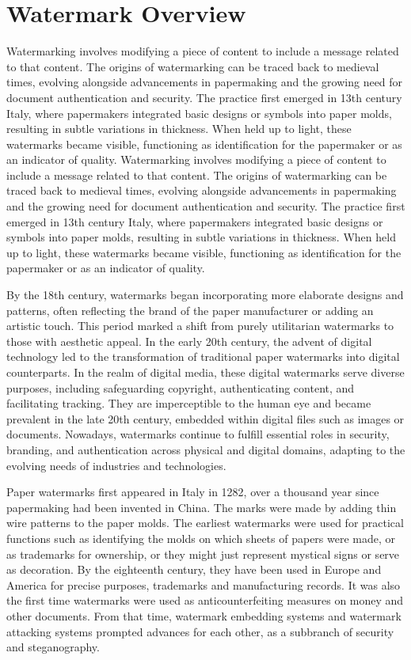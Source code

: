 \section{Watermark Overview}
Watermarking involves modifying a piece of content to include a message related to that content. The origins of watermarking can be traced back to medieval times, evolving alongside advancements in papermaking and the growing need for document authentication and security. The practice first emerged in 13th century Italy, where papermakers integrated basic designs or symbols into paper molds, resulting in subtle variations in thickness. When held up to light, these watermarks became visible, functioning as identification for the papermaker or as an indicator of quality. Watermarking involves modifying a piece of content to include a message related to that content. The origins of watermarking can be traced back to medieval times, evolving alongside advancements in papermaking and the growing need for document authentication and security. The practice first emerged in 13th century Italy, where papermakers integrated basic designs or symbols into paper molds, resulting in subtle variations in thickness. When held up to light, these watermarks became visible, functioning as identification for the papermaker or as an indicator of quality.

By the 18th century, watermarks began incorporating more elaborate designs and patterns, often reflecting the brand of the paper manufacturer or adding an artistic touch. This period marked a shift from purely utilitarian watermarks to those with aesthetic appeal. In the early 20th century, the advent of digital technology led to the transformation of traditional paper watermarks into digital counterparts. In the realm of digital media, these digital watermarks serve diverse purposes, including safeguarding copyright, authenticating content, and facilitating tracking. They are imperceptible to the human eye and became prevalent in the late 20th century, embedded within digital files such as images or documents. Nowadays, watermarks continue to fulfill essential roles in security, branding, and authentication across physical and digital domains, adapting to the evolving needs of industries and technologies.

Paper watermarks first appeared in Italy in 1282, over a thousand year since papermaking had been invented in China. The marks were made by adding thin wire patterns to the paper molds. The earliest watermarks were used for practical functions such as identifying the molds on which sheets of papers were made, or as trademarks for ownership, or they might just represent mystical signs or serve as decoration. By the eighteenth century, they have been used in Europe and America for precise purposes, trademarks and manufacturing records. It was also the first time watermarks were used as anticounterfeiting measures on money and other documents. From that time, watermark embedding systems and watermark attacking systems prompted advances for each other, as a subbranch of security and steganography.

